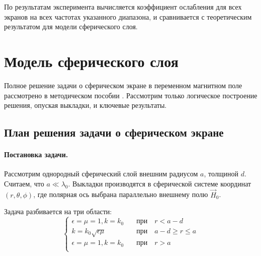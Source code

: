 По результатам эксперимента вычисляется коэффициент ослабления для всех экранов на всех частотах указанного диапазона, и сравнивается с теоретическим результатом для модели сферического слоя.

\newpage
\section{Модель сферического слоя}

Полное решение задачи о сферическом экране в переменном магнитном поле рассмотрено в  методическом пособии \cite{met}. Рассмотрим только логическое построение решения, опуская выкладки, и ключевые результаты.

\subsection{План решения задачи о сферическом экране}

\paragraph{Постановка задачи.} Рассмотрим однородный сферический слой внешним радиусом $a$, толщиной $d$. Считаем, что $a\ll\lambda_0$. Выкладки производятся в сферической системе координат $(r,\theta,\phi)$, где полярная ось выбрана параллельно внешнему полю $\vec{H}_0$.

Задача разбивается на три области:
\begin{equation}
	\left\{\begin{aligned}
		\epsilon=\mu=1, k=k_0 &\quad\text{при}\quad r<a-d\\
		k=k_0\sqrt{\epsilon\mu} &\quad\text{при}\quad  a-d \geq r\leq a\\
		\epsilon=\mu=1, k=k_0 &\quad\text{при}\quad r>a\\
	\end{aligned}\right.
\end{equation}

